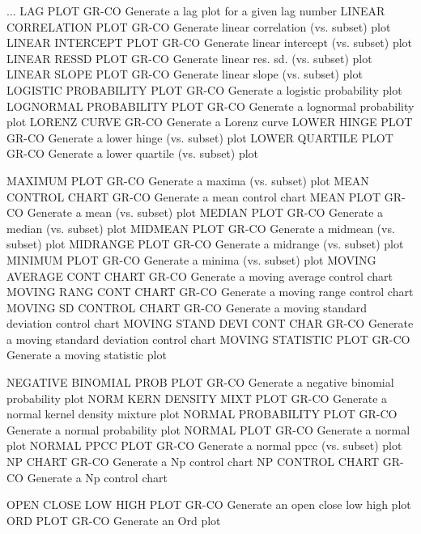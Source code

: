 ... LAG PLOT                GR-CO Generate a lag plot for a given lag number
LINEAR CORRELATION PLOT     GR-CO Generate linear correlation (vs. subset) plot
LINEAR INTERCEPT PLOT       GR-CO Generate linear intercept (vs. subset) plot
LINEAR RESSD PLOT           GR-CO Generate linear res. sd. (vs. subset) plot
LINEAR SLOPE PLOT           GR-CO Generate linear slope (vs. subset) plot
LOGISTIC PROBABILITY PLOT   GR-CO Generate a logistic probability plot
LOGNORMAL PROBABILITY PLOT  GR-CO Generate a lognormal probability plot
LORENZ CURVE                GR-CO Generate a Lorenz curve
LOWER HINGE PLOT            GR-CO Generate a lower hinge (vs. subset) plot
LOWER QUARTILE PLOT         GR-CO Generate a lower quartile (vs. subset) plot

MAXIMUM PLOT                GR-CO Generate a maxima (vs. subset) plot
MEAN CONTROL CHART          GR-CO Generate a mean control chart
MEAN PLOT                   GR-CO Generate a mean (vs. subset) plot
MEDIAN PLOT                 GR-CO Generate a median (vs. subset) plot
MIDMEAN PLOT                GR-CO Generate a midmean (vs. subset) plot
MIDRANGE PLOT               GR-CO Generate a midrange (vs. subset) plot
MINIMUM PLOT                GR-CO Generate a minima (vs. subset) plot
MOVING AVERAGE CONT CHART   GR-CO Generate a moving average control chart
MOVING RANG CONT CHART      GR-CO Generate a moving range control chart
MOVING SD CONTROL CHART     GR-CO Generate a moving standard deviation control chart
MOVING STAND DEVI CONT CHAR GR-CO Generate a moving standard deviation control chart
MOVING STATISTIC PLOT       GR-CO Generate a moving statistic plot

NEGATIVE BINOMIAL PROB PLOT GR-CO Generate a negative binomial probability plot
NORM KERN DENSITY MIXT PLOT GR-CO Generate a normal kernel density mixture plot
NORMAL PROBABILITY PLOT     GR-CO Generate a normal probability plot
NORMAL PLOT                 GR-CO Generate a normal plot
NORMAL PPCC PLOT            GR-CO Generate a normal ppcc (vs. subset) plot
NP CHART                    GR-CO Generate a Np control chart
NP CONTROL CHART            GR-CO Generate a Np control chart

OPEN CLOSE LOW HIGH PLOT    GR-CO Generate an open close low high plot
ORD PLOT                    GR-CO Generate an Ord plot

